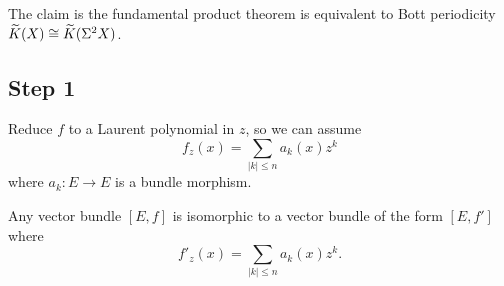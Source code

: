 
\lecture{}

\begin{node}
The claim is the fundamental product theorem is equivalent to Bott
periodicity $\widetilde{K}(X)\cong\widetilde{K}(\Sigma^{2}X)$.
\end{node}

\subsection*{Step 1}

\begin{node}
Reduce $f$ to a Laurent polynomial in $z$, so we can assume
\begin{equation}
f_{z}(x)=\sum_{|k|\leq n}a_{k}(x)z^{k}
\end{equation}
where $a_{k}\colon E\to E$ is a bundle morphism.
\end{node}

\begin{proposition}
Any vector bundle $[E,f]$ is isomorphic to a vector bundle of the form
$[E,f']$ where
\begin{equation}
f'_{z}(x)=\sum_{|k|\leq n}a_{k}(x)z^{k}.
\end{equation}
\end{proposition}